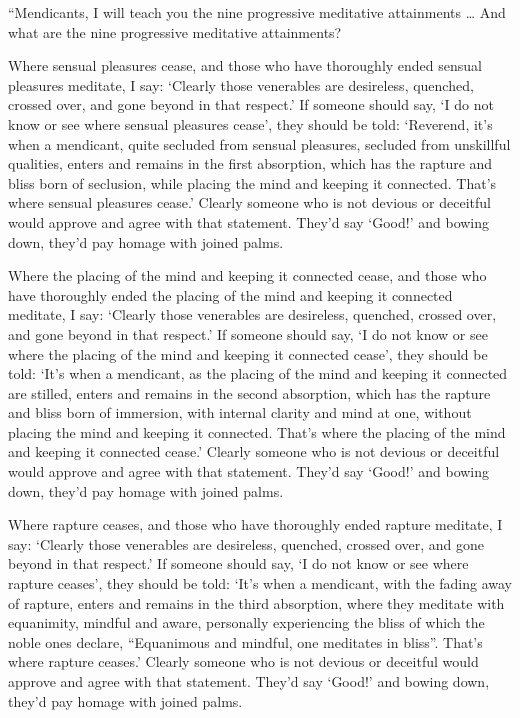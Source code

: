 \documentclass[12pt,openany]{book}%
\begin{document}
“Mendicants, I will teach you the nine progressive meditative attainments … And what are the nine progressive meditative attainments? 

Where sensual pleasures cease, and those who have thoroughly ended sensual pleasures meditate, I say: ‘Clearly those venerables are desireless, quenched, crossed over, and gone beyond in that respect.’ If someone should say, ‘I do not know or see where sensual pleasures cease’, they should be told: ‘Reverend, it’s when a mendicant, quite secluded from sensual pleasures, secluded from unskillful qualities, enters and remains in the first absorption, which has the rapture and bliss born of seclusion, while placing the mind and keeping it connected. That’s where sensual pleasures cease.’ Clearly someone who is not devious or deceitful would approve and agree with that statement. They’d say ‘Good!’ and bowing down, they’d pay homage with joined palms. 

Where the placing of the mind and keeping it connected cease, and those who have thoroughly ended the placing of the mind and keeping it connected meditate, I say: ‘Clearly those venerables are desireless, quenched, crossed over, and gone beyond in that respect.’ If someone should say, ‘I do not know or see where the placing of the mind and keeping it connected cease’, they should be told: ‘It’s when a mendicant, as the placing of the mind and keeping it connected are stilled, enters and remains in the second absorption, which has the rapture and bliss born of immersion, with internal clarity and mind at one, without placing the mind and keeping it connected. That’s where the placing of the mind and keeping it connected cease.’ Clearly someone who is not devious or deceitful would approve and agree with that statement. They’d say ‘Good!’ and bowing down, they’d pay homage with joined palms. 

Where rapture ceases, and those who have thoroughly ended rapture meditate, I say: ‘Clearly those venerables are desireless, quenched, crossed over, and gone beyond in that respect.’ If someone should say, ‘I do not know or see where rapture ceases’, they should be told: ‘It’s when a mendicant, with the fading away of rapture, enters and remains in the third absorption, where they meditate with equanimity, mindful and aware, personally experiencing the bliss of which the noble ones declare, “Equanimous and mindful, one meditates in bliss”. That’s where rapture ceases.’ Clearly someone who is not devious or deceitful would approve and agree with that statement. They’d say ‘Good!’ and bowing down, they’d pay homage with joined palms. 
\end{document}
